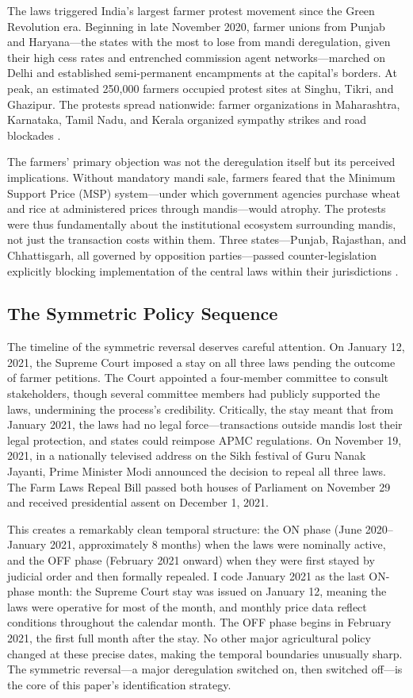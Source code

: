 \documentclass[12pt]{article}
\begin{document}
The laws triggered India's largest farmer protest movement since the Green Revolution era. Beginning in late November 2020, farmer unions from Punjab and Haryana---the states with the most to lose from mandi deregulation, given their high cess rates and entrenched commission agent networks---marched on Delhi and established semi-permanent encampments at the capital's borders. At peak, an estimated 250,000 farmers occupied protest sites at Singhu, Tikri, and Ghazipur. The protests spread nationwide: farmer organizations in Maharashtra, Karnataka, Tamil Nadu, and Kerala organized sympathy strikes and road blockades \citep{aggarwal2024political}.

The farmers' primary objection was not the deregulation itself but its perceived implications. Without mandatory mandi sale, farmers feared that the Minimum Support Price (MSP) system---under which government agencies purchase wheat and rice at administered prices through mandis---would atrophy. The protests were thus fundamentally about the institutional ecosystem surrounding mandis, not just the transaction costs within them. Three states---Punjab, Rajasthan, and Chhattisgarh, all governed by opposition parties---passed counter-legislation explicitly blocking implementation of the central laws within their jurisdictions \citep{gulati2020farm}.

\subsection{The Symmetric Policy Sequence}

The timeline of the symmetric reversal deserves careful attention. On January 12, 2021, the Supreme Court imposed a stay on all three laws pending the outcome of farmer petitions. The Court appointed a four-member committee to consult stakeholders, though several committee members had publicly supported the laws, undermining the process's credibility. Critically, the stay meant that from January 2021, the laws had no legal force---transactions outside mandis lost their legal protection, and states could reimpose APMC regulations. On November 19, 2021, in a nationally televised address on the Sikh festival of Guru Nanak Jayanti, Prime Minister Modi announced the decision to repeal all three laws. The Farm Laws Repeal Bill passed both houses of Parliament on November 29 and received presidential assent on December 1, 2021.

This creates a remarkably clean temporal structure: the ON phase (June 2020--January 2021, approximately 8 months) when the laws were nominally active, and the OFF phase (February 2021 onward) when they were first stayed by judicial order and then formally repealed. I code January 2021 as the last ON-phase month: the Supreme Court stay was issued on January 12, meaning the laws were operative for most of the month, and monthly price data reflect conditions throughout the calendar month. The OFF phase begins in February 2021, the first full month after the stay. No other major agricultural policy changed at these precise dates, making the temporal boundaries unusually sharp. The symmetric reversal---a major deregulation switched on, then switched off---is the core of this paper's identification strategy.
\end{document}
